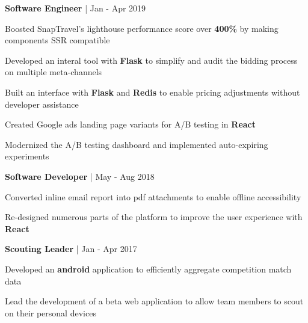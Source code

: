 \begin{cventries}

\cventry
{\textbf{Software Engineer} | \color{awesome}{SnapTravel}}
{Jan - Apr 2019} %
{ %
\begin{cvitems}
\item {Boosted SnapTravel's lighthouse performance score over \textbf{400\%} by making components SSR compatible}
\item {Developed an interal tool with \textbf{Flask} to simplify and audit the bidding process on multiple meta-channels}
\item {Built an interface with \textbf{Flask} and \textbf{Redis} to enable pricing adjustments without developer assistance}
\item {Created Google ads landing page variants for A/B testing in \textbf{React}}
\item {Modernized the A/B testing dashboard and implemented auto-expiring experiments}
\end{cvitems}
}


\cventry
{\textbf{Software Developer} | \color{awesome}{TemboSocial}}
{May - Aug 2018} %
{ %
\begin{cvitems}
\item {Converted inline email report into pdf attachments to enable offline accessibility}
\item {Re-designed numerous parts of the platform to improve the user experience with \textbf{React}}
\end{cvitems}
}


\cventry
{\textbf{Scouting Leader} | \color{awesome}{FRC Team 610}}
{Jan - Apr 2017} %
{ %
\begin{cvitems}
\item {Developed an \textbf{android} application to efficiently aggregate competition match data}
\item {Lead the development of a beta web application to allow team members to scout on their personal devices}
\end{cvitems}
}


\end{cventries}
